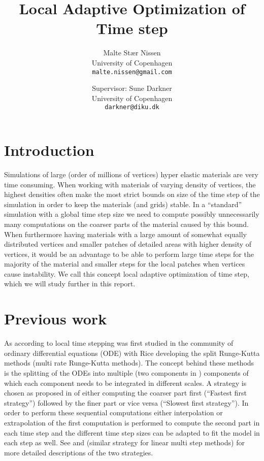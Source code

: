 \documentclass[11pt,a4paper]{article}
\title{Local Adaptive Optimization of Time step}
\author{Malte Stær Nissen\\University of Copenhagen\\\texttt{malte.nissen@gmail.com} \and Supervisor: Sune Darkner\\University of Copenhagen\\\texttt{darkner@diku.dk}}
\begin{document}
\maketitle

\tableofcontents

\clearpage

\section{Introduction}
Simulations of large (order of millions of vertices) hyper elastic materials
are very time consuming. When working with materials of varying density of
vertices, the highest densities often make the most strict bounds on size of
the time step of the simulation in order to keep the materials (and grids)
stable. In a ``standard'' simulation with a global time step size we need
to compute possibly unnecessarily many computations on the coarser parts of
the material caused by this bound. When furthermore having materials with a
large amount of somewhat equally distributed vertices and smaller patches of
detailed areas with higher density of vertices, it would be an advantage to be
able to perform large time steps for the majority of the material and smaller
steps for the local patches when vertices cause instability. We call this
concept local adaptive optimization of time step, which we will study further
in this report.

\section{Previous work}
As according to \cite{Gander:2013} local time stepping was first studied
in the community of ordinary differential equations (ODE) with Rice
\cite{rice:1960} developing the split Runge-Kutta methods (multi rate
Runge-Kutta methods). The concept behind these methods is the splitting of
the ODEs into multiple (two components in \cite{rice:1960}) components of
which each component needs to be integrated in different scales. A strategy
is chosen as proposed in \cite{Kvaernoe:1999} of either computing the coarser
part first (``Fastest first strategy'') followed by the finer part or vice
versa (``Slowest first strategy''). In order to perform these sequential
computations either interpolation or extrapolation of the first computation
is performed to compute the second part in each time step and the different
time step sizes can be adapted to fit the model in each step as well. See
\cite{Kvaernoe:1999} and \cite{Gear:1984} (similar strategy for linear multi
step methods) for more detailed descriptions of the two strategies.
\end{document}
